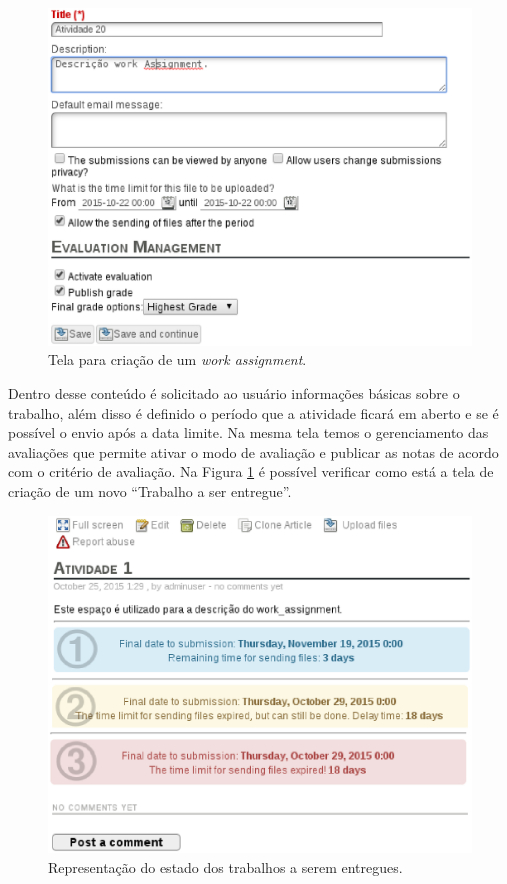 \begin{figure}[h]
    \centering
    \includegraphics[keepaspectratio=true,scale=0.6]
      {figuras/work-assignment-final.eps}
    \caption{Tela para criação de um \textit{work assignment}.}
    \label{fig:work-assignment-final}
\end{figure}

Dentro desse conteúdo é solicitado ao usuário informações básicas sobre o trabalho, além disso é definido o período que a atividade ficará em aberto e se é possível o envio após a data limite. Na mesma tela temos o gerenciamento das avaliações que permite ativar o modo de avaliação e publicar as notas de acordo com o critério de avaliação. Na Figura \ref{fig:work-assignment-final} é possível verificar como está a tela de criação de um novo ``Trabalho a ser entregue''.

\begin{figure}[h]
    \centering
    \includegraphics[keepaspectratio=true,scale=0.6]
      {figuras/work-status.eps}
    \caption{Representação do estado dos trabalhos a serem entregues.}
    \label{fig:work-status}
\end{figure}

